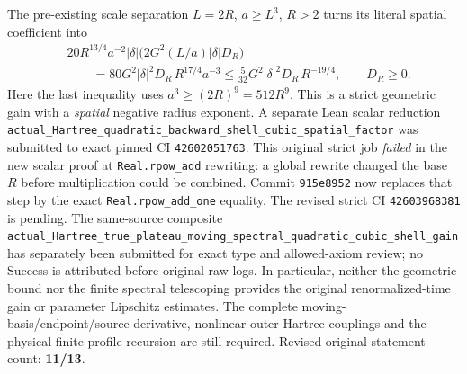 \documentclass[11pt]{amsart}
\begin{document}
The pre-existing scale separation \(L=2R\), \(a\ge L^3\),
\(R>2\) turns its literal spatial coefficient into
\[
\begin{aligned}
&20R^{13/4}a^{-2}|\delta|
  \bigl(2G^2(L/a)|\delta|D_R\bigr)\\
&\qquad =80G^2|\delta|^2D_R\,R^{17/4}a^{-3}
\le \frac5{32}G^2|\delta|^2D_R\,R^{-19/4},
\qquad D_R\ge0.
\end{aligned}
\]
Here the last inequality uses \(a^3\ge (2R)^9=512R^9\).
This is a strict geometric gain with a \emph{spatial} negative radius
exponent. A separate Lean scalar reduction
\texttt{actual\_Hartree\_quadratic\_backward\_shell\_cubic\_spatial\_factor}
was submitted to exact pinned CI \texttt{42602051763}.
This original strict job \emph{failed} in the new scalar proof at
\texttt{Real.rpow\_add} rewriting: a global rewrite changed the
base \(R\) before multiplication could be combined.
Commit \texttt{915e8952} now replaces that step by the exact
\texttt{Real.rpow\_add\_one} equality. The revised strict
CI \texttt{42603968381} is pending. The same-source
composite \texttt{actual\_Hartree\_true\_plateau\_moving\_spectral\_quadratic\_cubic\_shell\_gain}
has separately been submitted for exact type and allowed-axiom
review; no Success is attributed before original raw logs.
In particular, neither the geometric bound nor the finite spectral
telescoping provides the original renormalized-time gain or parameter
Lipschitz estimates. The complete moving-basis/endpoint/source
derivative, nonlinear outer Hartree couplings and the physical
finite-profile recursion are still required. Revised original
statement count: \textbf{11/13}.
\end{document}
